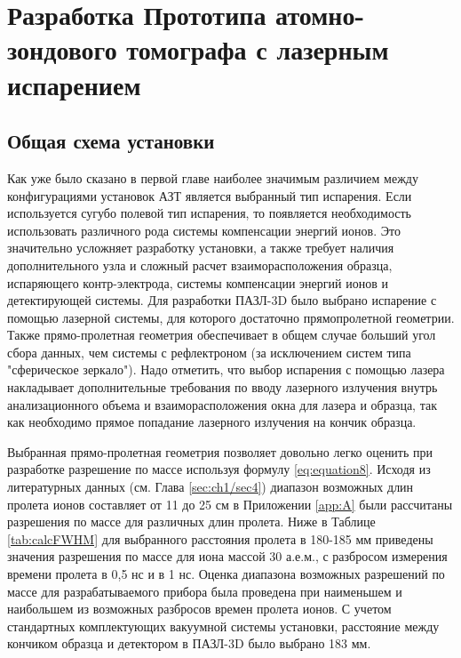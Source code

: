 \chapter{Разработка  Прототипа атомно-зондового томографа с лазерным испарением}\label{ch:ch2}


\section{Общая схема установки}\label{sec:ch2/sec1}

Как уже было сказано в первой главе наиболее значимым различием между конфигурациями установок АЗТ является выбранный тип испарения. Если используется сугубо полевой тип испарения, то появляется необходимость использовать различного рода системы компенсации энергий ионов. Это значительно усложняет разработку установки, а также требует наличия дополнительного узла и сложный расчет взаиморасположения образца, испаряющего контр-электрода, системы компенсации энергий ионов и детектирующей системы. Для разработки ПАЗЛ-3D \cite{scbibAPPLE} было выбрано испарение с помощью лазерной системы, для которого достаточно прямопролетной геометрии. Также прямо-пролетная геометрия обеспечивает в общем случае больший угол сбора данных, чем системы с рефлектроном (за исключением систем типа "сферическое зеркало"). Надо отметить, что выбор испарения с помощью лазера накладывает дополнительные требования по вводу лазерного излучения внутрь анализационного объема и взаиморасположения окна для лазера и образца, так как необходимо прямое попадание лазерного излучения на кончик образца.

Выбранная прямо-пролетная геометрия позволяет довольно легко оценить при разработке  разрешение по массе используя формулу \cref{eq:equation8}. Исходя из литературных данных (см. Глава \cref{sec:ch1/sec4}) диапазон возможных длин пролета ионов составляет от 11 до 25 см в Приложении \cref{app:A} были рассчитаны разрешения по массе для различных длин пролета. Ниже в Таблице \cref{tab:calcFWHM} для выбранного расстояния пролета в 180-185 мм приведены значения разрешения по массе для иона массой 30 а.е.м., с разбросом измерения времени пролета в 0,5 нс и в 1 нс. Оценка диапазона возможных разрешений по массе для разрабатываемого прибора была проведена при наименьшем и наибольшем из возможных разбросов времен пролета ионов. С учетом  стандартных комплектующих вакуумной системы установки, расстояние между кончиком образца и детектором в ПАЗЛ-3D было выбрано 183 мм.

